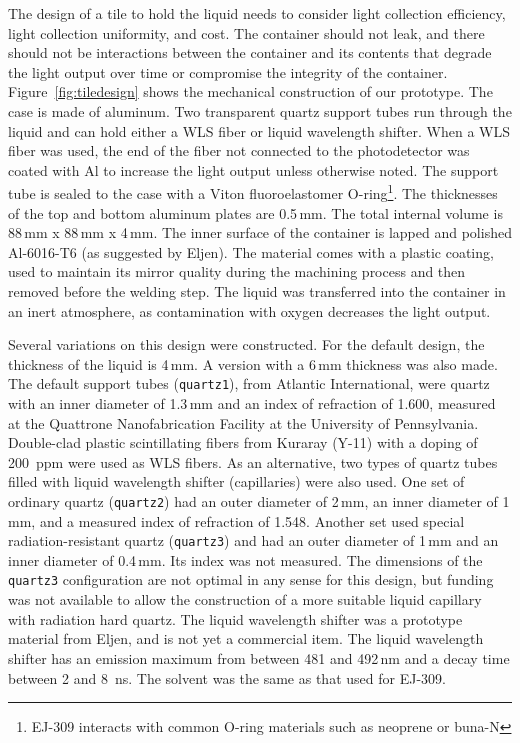 \documentclass[review]{elsarticle}
\begin{document}
The design of a tile to hold the liquid needs to consider light
collection efficiency, light collection uniformity, and cost. The
container should not leak, and there should not be interactions
between the container and its contents that degrade the light output
over time or compromise the integrity of the
container. 
Figure~\ref{fig:tiledesign} shows the mechanical
construction of our prototype. The case is made of aluminum. Two
transparent quartz support tubes
run through the
liquid and can hold either a WLS fiber or liquid
wavelength shifter.
When a WLS fiber was
used, the end of the fiber not connected to the photodetector was
coated with Al to increase the light output unless otherwise
noted. The support tube is sealed to the case with a Viton
fluoroelastomer O-ring\footnote{EJ-309 interacts with common O-ring materials
such as neoprene or buna-N}. 
The thicknesses of the top and bottom aluminum
plates are 0.5\,mm. The total internal volume is 88\,mm x 88\,mm x
4\,mm. The inner surface of the container is lapped and polished
Al-6016-T6 (as suggested by Eljen). The material comes with a
plastic coating, used to maintain its mirror quality during
the machining process and then removed before the welding step. The
liquid was transferred into the container in an inert atmosphere, as
contamination with oxygen decreases the light output.

Several variations on this design were constructed. For the default
design, the thickness of the liquid is 4\,mm. A version with a 6\,mm
thickness was also made. The default support tubes (\verb+quartz1+),
from Atlantic International, were quartz with an inner diameter of
1.3\,mm and an index of refraction of 1.600, measured at the Quattrone
Nanofabrication Facility at the University of Pennsylvania.
Double-clad plastic scintillating fibers from Kuraray (Y-11) with a
doping of 200~ppm were used as WLS fibers.  As an alternative, two
types of quartz tubes filled with liquid wavelength shifter
(capillaries) were also used.  One set of ordinary quartz
(\verb+quartz2+) had an outer diameter of 2\,mm, an inner diameter of
1\,mm, and a measured index of refraction of 1.548.  Another set used
special radiation-resistant quartz (\verb+quartz3+) and had an outer
diameter of 1\,mm and an inner diameter of 0.4\,mm.  Its index was not
measured.  The dimensions of the \verb+quartz3+ configuration are not optimal
in any sense for this design, but funding was not available to allow
the construction of a more suitable liquid capillary with radiation
hard quartz.  The liquid wavelength shifter was a prototype material
from Eljen, and is not yet a commercial item. The liquid wavelength
shifter has an emission maximum from between 481 and 492\,nm and a
decay time between 2 and 8~ns. The solvent was the same as that used
for EJ-309.
\end{document}
